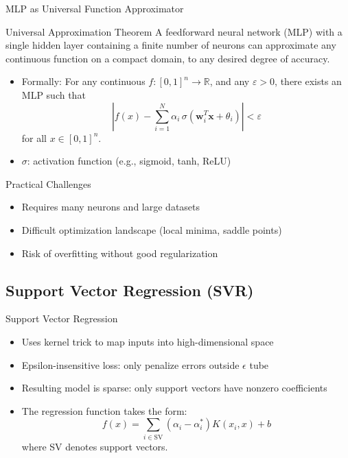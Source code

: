 \documentclass[german,10pt]{beamer}
\begin{document}
\begin{frame}{MLP as Universal Function Approximator}
\begin{block}{Universal Approximation Theorem}
A feedforward neural network (MLP) with a single hidden layer containing a finite number of neurons can approximate any continuous function on a compact domain, to any desired degree of accuracy.
\end{block}

\begin{itemize}
  \item Formally: For any continuous $f: [0,1]^n \rightarrow \mathbb{R}$, and any $\varepsilon > 0$, there exists an MLP such that
  \[
    \left| f(x) - \sum_{i=1}^N \alpha_i \, \sigma(\bm{w}_i^T \bm{x} + \theta_i) \right| < \varepsilon
  \]
  for all $x \in [0,1]^n$.
  \item $\sigma$: activation function (e.g., sigmoid, tanh, ReLU)
\end{itemize}

\pause

\begin{alertblock}{Practical Challenges}
\small{
\begin{itemize}
  \item Requires many neurons and large datasets
  \item Difficult optimization landscape (local minima, saddle points)
  \item Risk of overfitting without good regularization
\end{itemize}
}
\end{alertblock}

\end{frame}



\subsection{Support Vector Regression (SVR)}
\begin{frame}{Support Vector Regression}
  \begin{itemize}
    \item Uses kernel trick to map inputs into high-dimensional space
    \item Epsilon-insensitive loss: only penalize errors outside $\epsilon$ tube
    \item Resulting model is sparse: only support vectors have nonzero coefficients
    \item The regression function takes the form:
  \[
    f(x) = \sum_{i \in \text{SV}} (\alpha_i - \alpha_i^*) K(x_i, x) + b
  \]
  where SV denotes support vectors.
  \end{itemize}
\end{frame}
\end{document}

